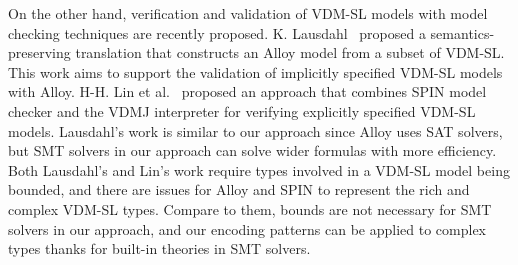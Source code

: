 On the other hand, verification and validation of VDM-SL models with model checking techniques are recently proposed. K. Lausdahl~\cite{kenneth:ifm2013} proposed a semantics-preserving translation that constructs an Alloy model from a subset of VDM-SL. This work aims to support the validation of implicitly specified VDM-SL models with Alloy. H-H. Lin et al.~\cite{DBLP:conf/ftscs/LinOKA15} proposed an approach that combines SPIN model checker and the VDMJ interpreter for verifying explicitly specified VDM-SL models. Lausdahl's work is similar to our approach since Alloy uses SAT solvers, but SMT solvers in our approach can solve wider formulas with more efficiency. Both Lausdahl's and Lin's work require types involved in a VDM-SL model being bounded, and there are issues for Alloy and SPIN to represent the rich and complex VDM-SL types. Compare to them, bounds are not necessary for SMT solvers in our approach, and our encoding patterns can be applied to complex types thanks for built-in theories in SMT solvers.


